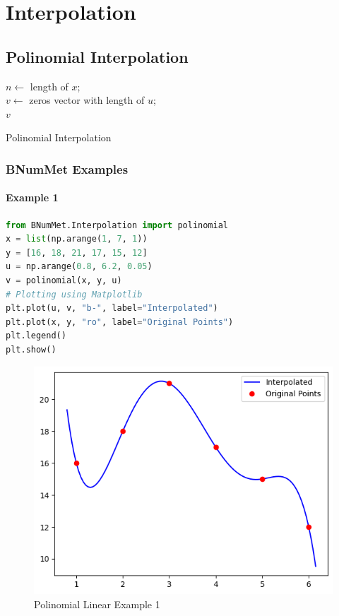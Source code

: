 
\section{Interpolation}
\subsection{Polinomial Interpolation}

\begin{algorithm}[H]
\SetAlgoLined
\DontPrintSemicolon
{}
$n \gets$ length of $x$;\\
$v \gets$ zeros vector with length of $u$;\\
\Return $v$
\caption{Polinomial Interpolation}
\end{algorithm}
\subsubsection{BNumMet Examples}
\paragraph{Example 1}{
\begin{lstlisting}[language=Python]
from BNumMet.Interpolation import polinomial
x = list(np.arange(1, 7, 1))
y = [16, 18, 21, 17, 15, 12]
u = np.arange(0.8, 6.2, 0.05)
v = polinomial(x, y, u)
# Plotting using Matplotlib
plt.plot(u, v, "b-", label="Interpolated")
plt.plot(x, y, "ro", label="Original Points")
plt.legend()
plt.show()
\end{lstlisting}
\begin{figure}[H]
    \centering
    \includegraphics{Include/Images/Thesis/Documentation/Interpolation/Polinomial Example 1.png}
    \caption{Polinomial Linear Example 1}
    \label{fig:Polinomial Linear Example 1}
\end{figure}
}
